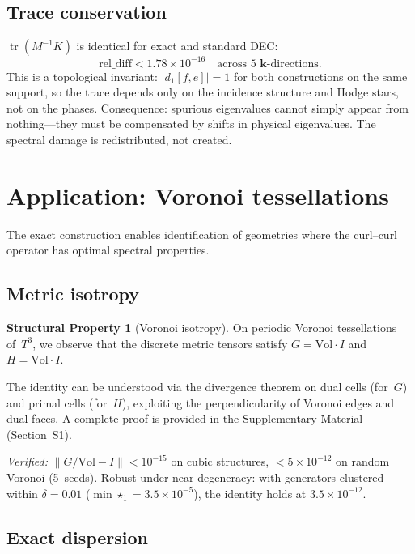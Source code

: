 \documentclass[12pt]{article}
\theoremstyle{definition}
\newtheorem{property}[theorem]{Structural Property}
\theoremstyle{remark}
\newcommand{\kk}{\mathbf{k}}
\newcommand{\Vol}{\mathrm{Vol}}
\DeclareMathOperator{\tr}{tr}
\begin{document}
\subsection{Trace conservation}

$\tr(M^{-1}K)$ is identical for exact and standard DEC:
\[
  \mathrm{rel\_diff} < 1.78 \times 10^{-16} \quad \text{across 5 $\kk$-directions.}
\]
This is a topological invariant: $|d_1[f,e]| = 1$ for both constructions on
the same support, so the trace depends only on the incidence structure and
Hodge stars, not on the phases. Consequence: spurious eigenvalues cannot simply
appear from nothing---they must be compensated by shifts in physical
eigenvalues. The spectral damage is redistributed, not created.

\section{Application: Voronoi tessellations}
\label{sec:voronoi}

The exact construction enables identification of geometries where the
curl--curl operator has optimal spectral properties.

\subsection{Metric isotropy}

\begin{property}[Voronoi isotropy]\label{prop:voronoi}
On periodic Voronoi tessellations of~$T^3$, we observe that the discrete
metric tensors satisfy $G = \Vol \cdot I$ and $H = \Vol \cdot I$.
\end{property}

The identity can be understood via the divergence theorem on dual cells
(for~$G$) and primal cells (for~$H$), exploiting the perpendicularity of
Voronoi edges and dual faces. A complete proof is provided in the
Supplementary Material (Section~S1).

\emph{Verified:} $\|G/\Vol - I\| < 10^{-15}$ on cubic structures,
$< 5 \times 10^{-12}$ on random Voronoi (5~seeds). Robust under
near-degeneracy: with generators clustered within $\delta = 0.01$
($\min\star_1 = 3.5 \times 10^{-5}$), the identity holds at
$3.5 \times 10^{-12}$.

\subsection{Exact dispersion}
\end{document}
